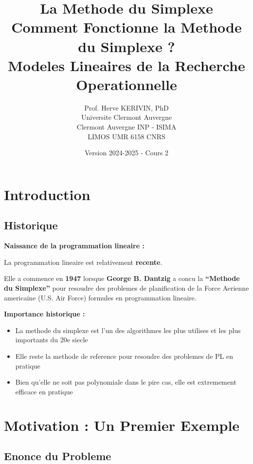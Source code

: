 \documentclass[12pt,a4paper]{article}
\title{\textbf{\Huge\color{titrebleu}La Methode du Simplexe}\\[0.5em]
\large\color{defvert}Comment Fonctionne la Methode du Simplexe ?\\
\small Modeles Lineaires de la Recherche Operationnelle}
\author{\large Prof. Herve KERIVIN, PhD\\
\small Universite Clermont Auvergne\\
Clermont Auvergne INP - ISIMA\\
LIMOS UMR 6158 CNRS}
\date{\large Version 2024-2025 - Cours 2}
\begin{document}
\maketitle
\tableofcontents
\newpage

\section{Introduction}

\subsection{Historique}

\begin{notecours}
\textbf{Naissance de la programmation lineaire :}

La programmation lineaire est relativement \textcolor{titrebleu}{\textbf{recente}}.

Elle a commence en \textcolor{importantrouge}{\textbf{1947}} lorsque \textcolor{defvert}{\textbf{George B. Dantzig}} a concu la \textbf{``Methode du Simplexe''} pour resoudre des problemes de planification de la Force Aerienne americaine (U.S. Air Force) formules en programmation lineaire.
\end{notecours}

\begin{astuce}
\textbf{Importance historique :}

\begin{itemize}
    \item La methode du simplexe est l'un des algorithmes les plus utilises et les plus importants du 20e siecle
    \item Elle reste la methode de reference pour resoudre des problemes de PL en pratique
    \item Bien qu'elle ne soit pas polynomiale dans le pire cas, elle est extremement efficace en pratique
\end{itemize}
\end{astuce}

\newpage
\section{Motivation : Un Premier Exemple}

\subsection{Enonce du Probleme}
\end{document}
